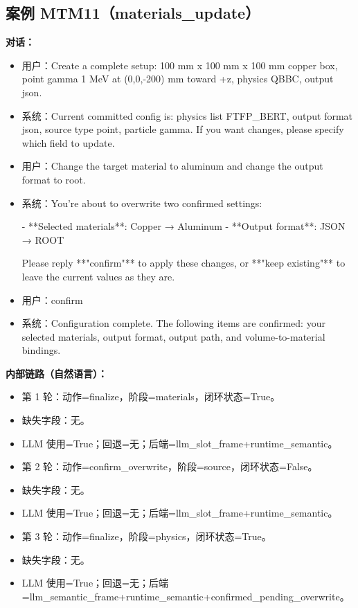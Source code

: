 \documentclass[11pt]{ctexart}
\begin{document}
\subsection{案例 MTM11（materials\_update）}
\textbf{对话：}
\begin{itemize}
\item 用户：Create a complete setup: 100 mm x 100 mm x 100 mm copper box, point gamma 1 MeV at (0,0,-200) mm toward +z, physics QBBC, output json.
\item 系统：Current committed config is: physics list FTFP\_BERT, output format json, source type point, particle gamma. If you want changes, please specify which field to update.
\item 用户：Change the target material to aluminum and change the output format to root.
\item 系统：You're about to overwrite two confirmed settings:

- **Selected materials**: Copper → Aluminum
- **Output format**: JSON → ROOT

Please reply **"confirm"** to apply these changes, or **"keep existing"** to leave the current values as they are.
\item 用户：confirm
\item 系统：Configuration complete. The following items are confirmed: your selected materials, output format, output path, and volume-to-material bindings.
\end{itemize}
\textbf{内部链路（自然语言）：}
\begin{itemize}
\item 第 1 轮：动作=finalize，阶段=materials，闭环状态=True。
\item 缺失字段：无。
\item LLM 使用=True；回退=无；后端=llm\_slot\_frame+runtime\_semantic。
\item 第 2 轮：动作=confirm\_overwrite，阶段=source，闭环状态=False。
\item 缺失字段：无。
\item LLM 使用=True；回退=无；后端=llm\_slot\_frame+runtime\_semantic。
\item 第 3 轮：动作=finalize，阶段=physics，闭环状态=True。
\item 缺失字段：无。
\item LLM 使用=True；回退=无；后端=llm\_semantic\_frame+runtime\_semantic+confirmed\_pending\_overwrite。
\end{itemize}
\end{document}
